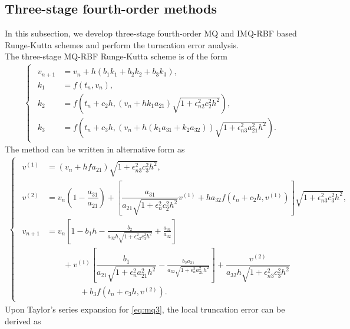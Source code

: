 \documentclass[a4paper, preprint,11pt]{elsarticle}
\numberwithin{equation}{section}
\begin{document}
\subsection{Three-stage fourth-order methods}
In this subsection, we develop three-stage fourth-order MQ and IMQ-RBF based Runge-Kutta schemes and perform the turncation error analysis.\\
\newline
{} The three-stage MQ-RBF Runge-Kutta scheme is of the form
\begin{eqnarray}\label{eq:mq3}
\begin{cases}
\begin{aligned}
v_{n+1} &= v_n + h(b_1 k_1 + b_2 k_2 + b_3 k_3),\\
k_1 &= f(t_n, v_n),  \\
k_2 &= f\left(t_n + c_2 h,(v_n + hk_1a_{21}) \sqrt{1 + \epsilon_{n2}^2 c_{2}^2 h^2}  \right),\\
k_3 &= f\left(t_n + c_3 h,(v_n + h(k_1a_{31} + k_2a_{32})) \sqrt{1 + \epsilon_{n3}^2 a_{21}^2 h^2}  \right). 
\end{aligned}
\end{cases}   
\end{eqnarray}
The method can be written in alternative form as 
\begin{eqnarray*}
\begin{cases}
\begin{aligned}
 v^{(1)} &= \left(v_n + h f a_{21}\right)\sqrt{1 + \epsilon_{n3}^2 c_3^2 h^2}, \\
    v^{(2)} &= v_n \left(1 - \dfrac{a_{31}}{a_{21}}\right)
    + \left[ \dfrac{a_{31} }{a_{21} \sqrt{1 + \epsilon_{n}^{2} c_2^2 h^2}}v^{(1)}
    + h a_{32} f(t_n + c_2 h, v^{(1)}) \right] \sqrt{1 + \epsilon_{n3}^2 c_3^2 h^2}, \\
    v_{n+1} &= v_n \left[ 1 - b_1 h 
    - \frac{b_2}{a_{32} h \sqrt{1 + \epsilon_{n3}^2 c_3^2 h^2}} 
    + \frac{a_{31}}{a_{32}} \right]\\
 & \qquad+ v^{(1)} \left[ \dfrac{b_1}{a_{21} \sqrt{1 + \epsilon_n^2 a_{21}^2 h^2}} 
    - \frac{b_2 a_{31}}{a_{32} \sqrt{1 + \epsilon_n^2 a_{21}^2 h^2}} \right]+ \dfrac{v^{(2)}}{a_{32} h \sqrt{1 + \epsilon_{n3}^2 c_3^2 h^2}}\\ 
  & \qquad \qquad + b_3 f(t_n + c_3 h, v^{(2)}).
\end{aligned}
\end{cases}   
\end{eqnarray*}
Upon Taylor's series expansion for \eqref{eq:mq3}, the local truncation error can be derived as
\end{document}

